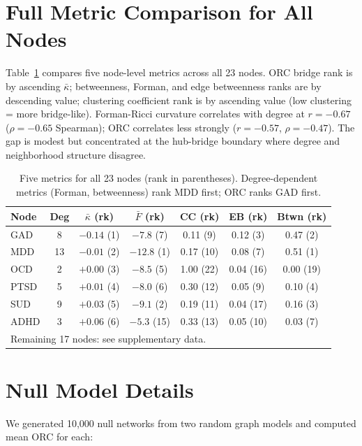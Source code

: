 \documentclass{article}
\begin{document}
\clearpage
\section{Full Metric Comparison for All Nodes}
\label{app:comparison}

Table~\ref{tab:comparison_full} compares five node-level metrics across all 23 nodes. ORC bridge rank is by ascending $\bar\kappa$; betweenness, Forman, and edge betweenness ranks are by descending value; clustering coefficient rank is by ascending value (low clustering = more bridge-like). Forman-Ricci curvature correlates with degree at $r = -0.67$ ($\rho = -0.65$ Spearman); ORC correlates less strongly ($r = -0.57$, $\rho = -0.47$). The gap is modest but concentrated at the hub-bridge boundary where degree and neighborhood structure disagree.

\begin{table}[h]
\centering
\caption{Five metrics for all 23 nodes (rank in parentheses). Degree-dependent metrics (Forman, betweenness) rank MDD first; ORC ranks GAD first.}
\label{tab:comparison_full}
\footnotesize
\begin{tabular}{lcccccc}
\toprule
Node & Deg & $\bar\kappa$ (rk) & $\bar{F}$ (rk) & CC (rk) & EB (rk) & Btwn (rk) \\
\midrule
GAD   &  8 & $-0.14$ (1) & $-7.8$ (7)  & 0.11 (9) & 0.12 (3) & 0.47 (2) \\
MDD   & 13 & $-0.01$ (2) & $-12.8$ (1) & 0.17 (10) & 0.08 (7) & 0.51 (1) \\
OCD   &  2 & $+0.00$ (3) & $-8.5$ (5)  & 1.00 (22) & 0.04 (16) & 0.00 (19) \\
PTSD  &  5 & $+0.01$ (4) & $-8.0$ (6)  & 0.30 (12) & 0.05 (9) & 0.10 (4) \\
SUD   &  9 & $+0.03$ (5) & $-9.1$ (2)  & 0.19 (11) & 0.04 (17) & 0.16 (3) \\
ADHD  &  3 & $+0.06$ (6) & $-5.3$ (15) & 0.33 (13) & 0.05 (10) & 0.03 (7) \\
\midrule
\multicolumn{7}{l}{\footnotesize Remaining 17 nodes: see supplementary data.} \\
\bottomrule
\end{tabular}
\end{table}

\clearpage
\section{Null Model Details}
\label{app:null}

We generated 10{,}000 null networks from two random graph models and computed mean ORC for each:
\end{document}
